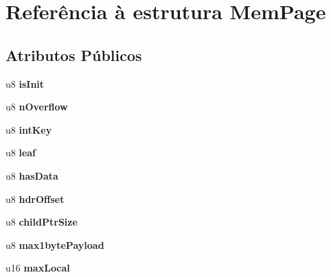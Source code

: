 \hypertarget{struct_mem_page}{\section{Referência à estrutura Mem\-Page}
\label{struct_mem_page}
}
\subsection*{Atributos Públicos}
\begin{DoxyCompactItemize}
\item 
\hypertarget{struct_mem_page_a3ab4ace46245be0fb2fb19eaa2862019}{u8 {\bfseries is\-Init}}\label{struct_mem_page_a3ab4ace46245be0fb2fb19eaa2862019}

\item 
\hypertarget{struct_mem_page_a3f7fa1a1eba3af840ef887e8ddd6d2cc}{u8 {\bfseries n\-Overflow}}\label{struct_mem_page_a3f7fa1a1eba3af840ef887e8ddd6d2cc}

\item 
\hypertarget{struct_mem_page_a46784c3c4708c7a582cff81a29c55323}{u8 {\bfseries int\-Key}}\label{struct_mem_page_a46784c3c4708c7a582cff81a29c55323}

\item 
\hypertarget{struct_mem_page_af18504bd0a2e7d39d9b485d434af0447}{u8 {\bfseries leaf}}\label{struct_mem_page_af18504bd0a2e7d39d9b485d434af0447}

\item 
\hypertarget{struct_mem_page_af7b608d25c2e326f82cc270cd53dd8f8}{u8 {\bfseries has\-Data}}\label{struct_mem_page_af7b608d25c2e326f82cc270cd53dd8f8}

\item 
\hypertarget{struct_mem_page_a01967a1a593980fb71c8ccf3393ae156}{u8 {\bfseries hdr\-Offset}}\label{struct_mem_page_a01967a1a593980fb71c8ccf3393ae156}

\item 
\hypertarget{struct_mem_page_aeba10281fc255d9bbc0e31486f8fbd48}{u8 {\bfseries child\-Ptr\-Size}}\label{struct_mem_page_aeba10281fc255d9bbc0e31486f8fbd48}

\item 
\hypertarget{struct_mem_page_a79548547cafb0e6d8549006bdc553f0a}{u8 {\bfseries max1byte\-Payload}}\label{struct_mem_page_a79548547cafb0e6d8549006bdc553f0a}

\item 
\hypertarget{struct_mem_page_a36394b7c3abf4652e7a24be4ab314f13}{u16 {\bfseries max\-Local}}\label{struct_mem_page_a36394b7c3abf4652e7a24be4ab314f13}


\end{DoxyCompactItemize}
